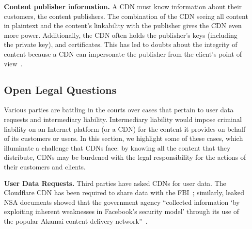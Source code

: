 \textbf{Content publisher information.} A CDN must know information
about their customers, the content publishers. The combination of the CDN seeing all content in plaintext and the content's linkability with the publisher gives the CDN even more power. Additionally, the CDN often holds the publisher's keys (including the private key), and certificates.  This has led to doubts 
about the integrity of content because a CDN can impersonate the publisher from the client's point of view~\cite{levy2015stickler}.



\subsection{Open Legal Questions}

Various parties are battling in the courts over cases that pertain to user
data requests and intermediary liability.  Intermediary liability would impose
criminal liability on an Internet platform (or a CDN) for the content it
provides on behalf of its customers or users. In this section, we highlight
some of these cases, which illuminate a challenge that CDNs face: by knowing
all the content that they distribute, CDNs may be burdened with the legal
responsibility for the actions of their customers and clients.

\textbf{User Data Requests.} Third parties have asked CDNs for user data. The Cloudflare CDN has been required
to share data with the FBI~\cite{cloudflare_nsl}; similarly, leaked NSA documents showed that the government agency ``collected information `by exploiting inherent 
weaknesses in Facebook's security model' through its use of the popular Akamai content
delivery network''~\cite{facebook_surv}.

